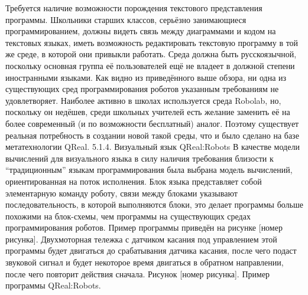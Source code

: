 Требуется наличие возможности порождения текстового представления программы. Школьники старших классов, серьёзно занимающиеся программированием, должны видеть связь между диаграммами и кодом на текстовых языках, иметь возможность редактировать текстовую программу в той же среде, в которой они привыкли работать.
Среда должна быть русскоязычной, поскольку основная группа её пользователей ещё не владеет в должной степени иностранными языками.
	Как видно из приведённого выше обзора, ни одна из существующих сред программирования роботов указанным требованиям не удовлетворяет. Наиболее активно в школах используется среда Robolab, но, поскольку он недёшев, среди школьных учителей есть желание заменить её на более современный (и по возможности бесплатный) аналог. Поэтому существует реальная потребность в создании новой такой среды, что и было сделано на базе метатехнологии QReal.
5.1.4. Визуальный язык QReal:Robots
	В качестве модели вычислений для визуального языка в силу наличия требования близости к “традиционным” языкам программирования была выбрана модель вычислений, ориентированная на поток исполнения. Блок языка представляет собой элементарную команду роботу, связи между блоками указывают последовательность, в которой выполняются блоки, это делает программы больше похожими на блок-схемы, чем программы на существующих средах программирования роботов. Пример программы приведён на рисунке [номер рисунка]. Двухмоторная тележка с датчиком касания под управлением этой программы будет двигаться до срабатывания датчика касания, после чего подаст звуковой сигнал и будет некоторое время двигаться в обратном направлении, после чего повторит действия сначала.
Рисунок [номер рисунка]. Пример программы QReal:Robots.

